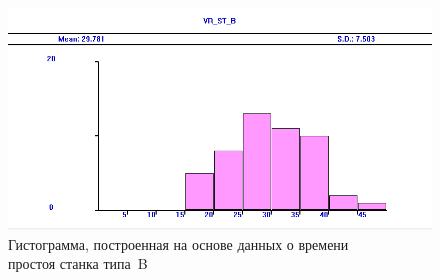 \begin{figure}[h!]
  \centering
  \includegraphics[width=0.8\linewidth]{pic/histogram_2}
  \caption{Гистограмма, построенная на основе данных о времени \\
    простоя станка типа~B}
  \label{pic:histogram_2}
\end{figure}

\newpage

